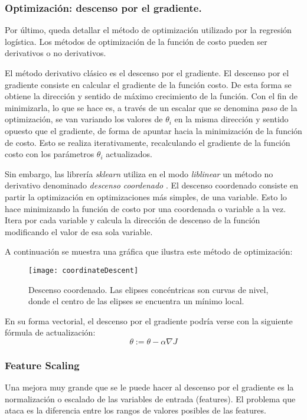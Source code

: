 \subsubsection{Optimización: descenso por el gradiente.}
Por último, queda detallar el método de optimización utilizado por la regresión logística. Los métodos de optimización de la función de costo pueden ser derivativos o no derivativos.

El método derivativo clásico es el descenso por el gradiente. El descenso por el gradiente consiste en calcular el gradiente de la función costo. De esta forma se obtiene la dirección y sentido de máximo crecimiento de la función. Con el fin de minimizarla, lo que se hace es, a través de un escalar que se denomina \textit{paso} de la optimización, se van variando los valores de $\theta_{i}$ en la misma dirección y sentido opuesto que el gradiente, de forma de apuntar hacia la minimización de la función de costo. Esto se realiza iterativamente, recalculando el gradiente de la función costo con los parámetros $\theta_{i}$ actualizados.

Sin embargo, las librería \textit{sklearn} utiliza en el modo \textit{liblinear} un método no derivativo denominado \textit{descenso coordenado} \cite{sklearnLinearModel}. El descenso coordenado consiste en partir la optimización en optimizaciones más simples, de una variable. Esto lo hace minimizando la función de costo por una coordenada o variable a la vez. Itera por cada variable y calcula la dirección de descenso de la función modificando el valor de esa sola variable.

A continuación se muestra una gráfica que ilustra este método de optimización:

\begin{figure}[H]
\centering
\texttt{[image: coordinateDescent]}
\caption{Descenso coordenado. Las elipses concéntricas son curvas de nivel, donde el centro de las elipses se encuentra un mínimo local. \cite{wikipediaCoordinateDescent}}
\label{fig:coordinateDescent}
\end{figure}

En su forma vectorial, el descenso por el gradiente podría verse con la siguiente fórmula de actualización:
\begin{equation}
\theta := \theta - \alpha \nabla J
\end{equation}

\subsubsection{Feature Scaling}
Una mejora muy grande que se le puede hacer al descenso por el gradiente es la normalización o escalado de las variables de entrada (features). El problema que ataca es la diferencia entre los rangos de valores posibles de las features. 


